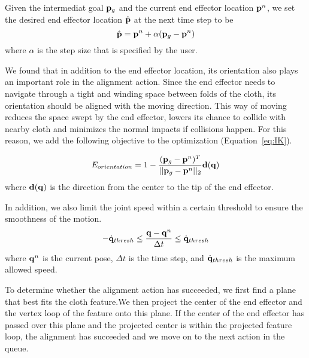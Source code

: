 Given the intermediat goal $\mathbf{p}_g$ and the current end effector location $\mathbf{p}^n$, we set the desired end effector location $\hat{\mathbf{p}}$ at the next time step to be 
\begin{equation}
  \hat{\mathbf{p}} = \mathbf{p}^n+\alpha(\mathbf{p}_g - \mathbf{p}^n)
  \label{eq:target}
\end{equation}
where $\alpha$ is the step size that is specified by the user.

We found that in addition to the end effector location, its orientation also plays an important role in the alignment action. Since the end effector needs to navigate through a tight and winding space between folds of the cloth, its orientation should be aligned with the moving direction. This way of moving reduces the space swept by the end effector, lowers its chance to collide with nearby cloth and minimizes the normal impacts if collisions happen. For this reason, we add the following objective to the optimization (Equation~\ref{eq:IK}).

\begin{displaymath}
E_{orientation} = 1-\frac{(\mathbf{p}_g-\mathbf{p}^n)^T}{||\mathbf{p}_g-\mathbf{p}^n||_2}\mathbf{d(q})
\end{displaymath}
where $\mathbf{d(q)}$ is the direction from the center to the tip of the end effector.

In addition, we also limit the joint speed within a certain threshold to ensure the smoothness of the motion.
\begin{displaymath}
-\dot{\mathbf{q}}_{thresh} \leq \frac{\mathbf{q} - \mathbf{q}^n}{\Delta t} \leq \dot{\mathbf{q}}_{thresh}
\end{displaymath}
where $\mathbf{q}^n$ is the current pose, $\Delta t$ is the time step, and $\dot{\mathbf{q}}_{thresh}$ is the maximum allowed speed.

To determine whether the alignment action has succeeded, we first find a plane that best fits the cloth feature.We then project the center of the end effector and the vertex loop of the feature onto this plane. If the center of the end effector has passed over this plane and the projected center is within the projected feature loop, the alignment has succeeded and we move on to the next action in the queue.

